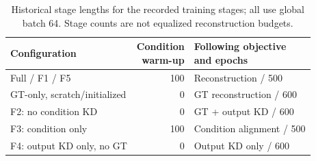 \begin{table}[t]
\caption{Historical stage lengths for the recorded training stages; all use global batch 64. Stage counts are not equalized reconstruction budgets.}
\label{tab:supp_schedule}
\centering\scriptsize
\setlength{\tabcolsep}{3pt}
\begin{tabular}{lrl}
\toprule
Configuration & \shortstack{Condition\\warm-up} & \shortstack[l]{Following objective\\and epochs}\\
\midrule
Full / F1 / F5 & 100 & Reconstruction / 500\\
GT-only, scratch/initialized & 0 & GT reconstruction / 600\\
F2: no condition KD & 0 & GT + output KD / 600\\
F3: condition only & 100 & Condition alignment / 500\\
F4: output KD only, no GT & 0 & Output KD only / 600\\
\bottomrule
\end{tabular}
\end{table}
